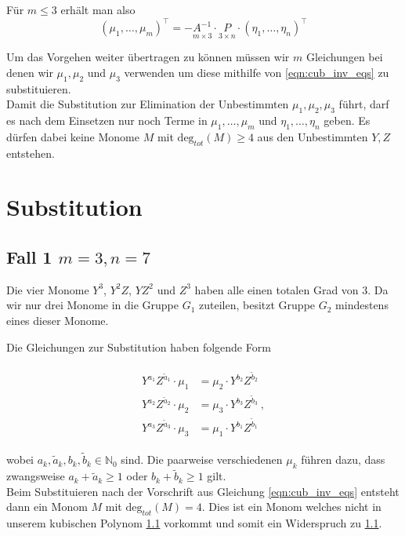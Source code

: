 \documentclass[a4paper,twoside, 11pt]{book}
\newcommand{\N}{{\mathbb N}}
\newcommand{\totdeg}{\text{deg}_{tot}}
\theoremstyle{custom}
\theoremstyle{custom}
\begin{document}
	Für $m \leq 3$ erhält man also 
	\begin{equation}\label{eqn:cub_inv_eqs}
		\left(\mu_1,\ldots,\mu_m\right)^{\intercal} = -\underset{\scriptscriptstyle m\times 3}{A^{-1}}\cdot \underset{\scriptscriptstyle 3\times n}{P} \cdot \left(\eta_1,\ldots,\eta_n\right)^{\intercal}
	\end{equation}
	
	Um das Vorgehen weiter übertragen zu können müssen wir $m$ Gleichungen bei denen wir $\mu_1, \mu_2$ und $\mu_3$ verwenden um diese mithilfe von \eqref{eqn:cub_inv_eqs} zu substituieren.\\
	Damit die Substitution zur Elimination der Unbestimmten $\mu_1, \mu_2, \mu_3$ führt, darf es nach dem Einsetzen nur noch Terme in $\mu_1, \ldots, \mu_m$ und $\eta_1,\ldots,\eta_n$ geben. Es dürfen dabei keine Monome $M$ mit $\totdeg\left(M\right)\geq 4$ aus den Unbestimmten $Y,Z$ entstehen.
	\section{Substitution}
	\subsection{Fall 1 $m=3, n=7$}
	Die vier Monome $Y^{3}$, $Y^{2}Z$, $YZ^{2}$ und $Z^{3}$ haben alle einen totalen Grad von $3$.
	Da wir nur drei Monome in die Gruppe $G_1$ zuteilen, besitzt Gruppe $G_2$ mindestens eines dieser Monome.
	
	Die Gleichungen zur Substitution haben folgende Form
	
\begin{gather}
		\begin{alignedat}{1}
	Y^{a_1}Z^{\tilde{a}_1} \cdot \mu_1	&= \mu_2 \cdot Y^{b_2}Z^{\tilde{b}_2} \\
	Y^{a_2}Z^{\tilde{a}_2} \cdot \mu_2	&= \mu_3 \cdot Y^{b_3}Z^{\tilde{b}_3} \ ,\\
	Y^{a_3}Z^{\tilde{a}_3} \cdot \mu_3	&= \mu_1 \cdot Y^{b_1}Z^{\tilde{b}_1}
	\end{alignedat}
\end{gather}

wobei $a_k, \tilde{a}_k ,b_k , \tilde{b}_k \in \N_{0}$ sind.
 Die paarweise verschiedenen $\mu_k$ führen dazu, dass zwangsweise $a_k + \tilde{a}_k \geq 1$ oder $b_k + \tilde{b}_k \geq 1$ gilt.\\

Beim Substituieren nach der Vorschrift aus Gleichung \eqref{eqn:cub_inv_eqs} entsteht dann ein Monom $M$ mit $\totdeg\left(M\right) = 4$. Dies ist ein Monom welches nicht in unserem kubischen Polynom \ref{} vorkommt und somit ein Widerspruch zu \ref{}.
\end{document}
